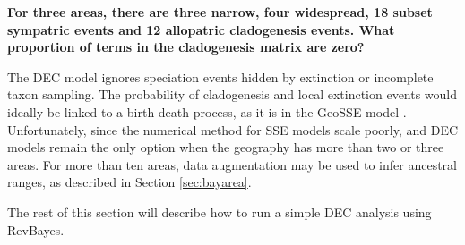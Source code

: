 {\bf {} For three areas, there are three narrow, four widespread, 18 subset sympatric events and 12 allopatric cladogenesis events. What proportion of terms in the cladogenesis matrix are zero?}

The DEC model ignores speciation events hidden by extinction or incomplete taxon sampling.
The probability of cladogenesis and local extinction events would ideally be linked to a birth-death process, as it is in the GeoSSE model \citep{Goldberg2011}.
Unfortunately, since the numerical method for SSE models scale poorly, and DEC models remain the only option when the geography has more than two or three areas.
For more than ten areas, data augmentation may be used to infer ancestral ranges, as described in Section \ref{sec:bayarea}.


The rest of this section will describe how to run a simple DEC analysis using RevBayes.

\newpage
